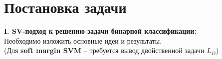 





\large
\clearpage
{}
\setcounter{page}{2}
\clearpage

\tableofcontents
\clearpage

\section{Постановка задачи}
\textbf{I. SV-подход к решению задачи бинарной классификации:}
\\ Необходимо изложить основные идеи и результаты.
\\(Для \textbf{soft margin SVM} – требуется вывод двойственной задачи $L_D$)
\\


